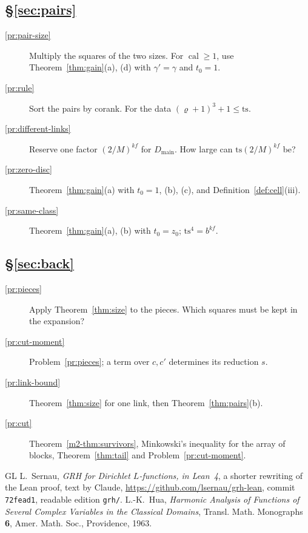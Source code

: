 \documentclass[reqno]{amsart}
\theoremstyle{definition}
\theoremstyle{plain}
\theoremstyle{remark}
\newcommand{\Dmain}{D_{\mathrm{main}}}
\newcommand{\ts}{\mathrm{ts}}
\newcommand{\calb}{\operatorname{cal}}
\begin{document}
\subsection*{\S\ref{sec:pairs}}
\begin{description}
\item[\ref{pr:pair-size}] Multiply the squares of the two sizes.  For \(\calb\ge1\), use Theorem~\ref{thm:gain}(a), (d) with \(\gamma'=\gamma\) and \(t_0=1\).
\item[\ref{pr:rule}] Sort the pairs by corank.  For the data \((\varrho+1)^3+1\le\ts\).
\item[\ref{pr:different-links}] Reserve one factor \((2/M)^{kf}\) for \(\Dmain\).  How large can \(\ts(2/M)^{kf}\) be?
\item[\ref{pr:zero-disc}] Theorem~\ref{thm:gain}(a) with \(t_0=1\), (b), (c), and Definition~\ref{def:cell}(iii).
\item[\ref{pr:same-class}] Theorem~\ref{thm:gain}(a), (b) with \(t_0=z_0\); \(\ts^4=b^{kf}\).
\end{description}

\subsection*{\S\ref{sec:back}}
\begin{description}
\item[\ref{pr:pieces}] Apply Theorem~\ref{thm:size} to the pieces.  Which squares must be kept in the expansion?
\item[\ref{pr:cut-moment}] Problem~\ref{pr:pieces}; a term over \(c,c'\) determines its reduction \(s\).
\item[\ref{pr:link-bound}] Theorem~\ref{thm:size} for one link, then Theorem~\ref{thm:pairs}(b).
\item[\ref{pr:cut}] Theorem~\ref{m2-thm:survivors}, Minkowski's inequality for the array of blocks, Theorem~\ref{thm:tail} and Problem~\ref{pr:cut-moment}.
\end{description}

\begin{thebibliography}{GL}
 L.~Sernau, \emph{GRH for Dirichlet \(L\)-functions, in Lean~4}, a shorter rewriting of the Lean proof, text by Claude, \url{https://github.com/lsernau/grh-lean}, commit \texttt{72fead1}, readable edition \texttt{grh/}.
 L.-K.~Hua, \emph{Harmonic Analysis of Functions of Several Complex Variables in the Classical Domains}, Transl. Math. Monographs \textbf{6}, Amer. Math. Soc., Providence, 1963.
\end{thebibliography}
\end{document}
